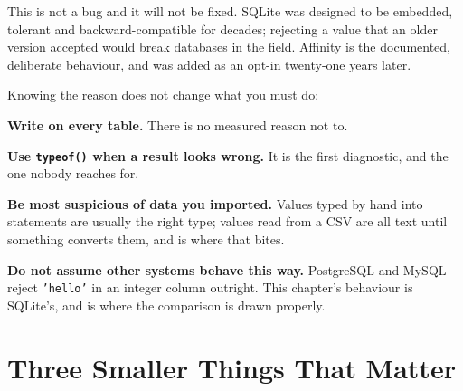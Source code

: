 \begin{alertbox}
This is not a bug and it will not be fixed. SQLite was designed to be
embedded, tolerant and backward-compatible for decades; rejecting a value that
an older version accepted would break databases in the field. Affinity is the
documented, deliberate behaviour, and  was added as an opt-in
twenty-one years later.

\smallskip
Knowing the reason does not change what you must do:

\begin{tight}
  \item \textbf{Write  on every table.} There is no measured
        reason not to.
  \item \textbf{Use \texttt{typeof()} when a result looks wrong.} It is the
        first diagnostic, and the one nobody reaches for.
  \item \textbf{Be most suspicious of data you imported.} Values typed by hand
        into  statements are usually the right type; values read
        from a CSV are all text until something converts them, and
         is where that bites.
  \item \textbf{Do not assume other systems behave this way.} PostgreSQL and
        MySQL reject \texttt{'hello'} in an integer column outright. This
        chapter's behaviour is SQLite's, and  is where the
        comparison is drawn properly.
\end{tight}
\end{alertbox}

\section{Three Smaller Things That Matter}

